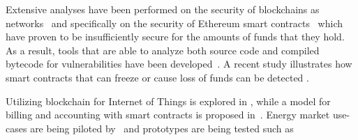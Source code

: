 Extensive analyses have been performed on the security of blockchains as networks~\cite{Gervais:2016:SPP:2976749.2978341, cryptoeprint:2018:236} and specifically on the security of Ethereum smart contracts~\cite{Atzei:2017:SAE:3080353.3080363} which have proven to be insufficiently secure for the amounts of funds that they hold. As a result, tools that are able to analyze both source code and compiled bytecode for vulnerabilities have been developed~\cite{Luu:2016:MSC:2976749.2978309, mythril, echidna, smartcheck, securify, zeus}. A recent study \cite{greedyprodigal} illustrates how smart contracts that can freeze or cause loss of funds can be detected \cite{maian}.

Utilizing blockchain for Internet of Things is explored in \cite{iot, integrationiot}, while a model for billing and accounting with smart contracts is proposed in~\cite{billaccount}. Energy market use-cases are being piloted by~\cite{gridplus, powerledger} and prototypes are being tested such as \cite{brooklyn, DBLP:journals/ife/MengelkampNBDW18}